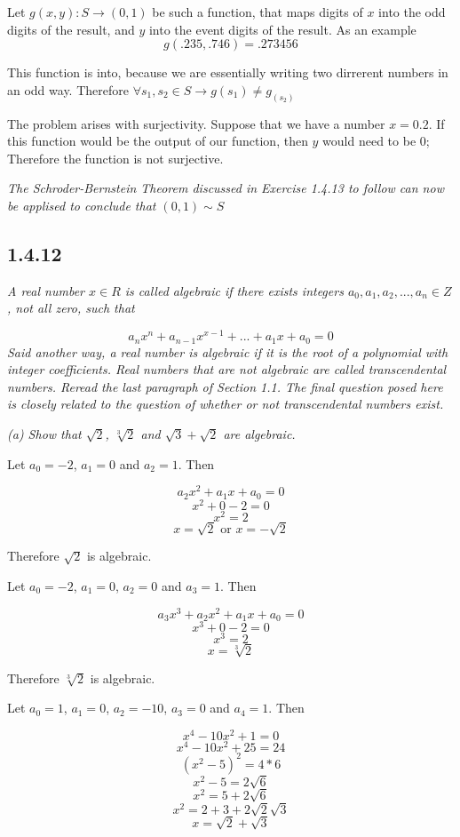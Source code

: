 \documentclass[11pt,oneside,titlepage]{book}
\begin{document}
Let $g(x, y): S \to (0, 1)$ be such a function, that maps digits of $x$ into the
odd digits of the result, and $y$ into the event digits of the result. As an example
$$g(.235, .746) = .273456$$

This function is into, because we are essentially writing two dirrerent numbers in an
odd way. 
Therefore $\forall s_1, s_2 \in S \to g(s_1) \neq g_(s_2) \ $

The problem arises with surjectivity. Suppose that we have a number $x = 0.2$. If
this function would be the output of our function, then $y$ would need to be 0;
Therefore the function is not surjective.

\textit{The Schroder-Bernstein Theorem discussed in Exercise 1.4.13 to follow
  can now be applised to conclude that $(0,1) \sim S$}

\subsection*{1.4.12}
\textit{A real number $x \in R$ is called algebraic if there exists integers
  $a_0, a_1, a_2, ..., a_n \in Z$, not all zero, such that }

$$a_n x^n + a_{n - 1} x^{x - 1} + ... + a_1 x + a_0 = 0$$
\textit{Said another way, a real number is algebraic if it is the root of a polynomial
  with integer coefficients. Real numbers that are not algebraic are called transcendental
  numbers. Reread the last paragraph of Section 1.1. The final question posed here is
  closely related to the question of whether or not transcendental numbers exist.}

\textit{(a) Show that $\sqrt{2}$, $\sqrt[3]{2}$ and $\sqrt{3} + \sqrt{2}$ are algebraic.}

Let $a_0 = -2$, $a_1 = 0$ and $a_2 = 1$. Then

$$a_2 x^2 + a_1 x + a_0 = 0$$
$$ x^2 + 0  - 2 = 0$$
$$x^2 = 2$$
$$x = \sqrt{2} \text{ or } x = -\sqrt{2}$$

Therefore $\sqrt{2}$ is algebraic.

Let $a_0 = -2$, $a_1 = 0$, $a_2 = 0$ and $a_3 = 1$. Then

$$a_3 x^3 + a_2 x^2 + a_1 x + a_0 = 0$$
$$ x^3 + 0  - 2 = 0$$
$$x^3 = 2$$
$$x = \sqrt[3]{2}$$

Therefore $\sqrt[3]{2}$ is algebraic.

Let $a_0 = 1$, $a_1 = 0$, $a_2 = -10$, $a_3 = 0$ and $a_4 = 1$. Then

$$x^4 - 10 x^2 + 1 = 0$$
$$x^4 - 10 x^2 + 25 =  24$$
$$(x^2 - 5)^2 =  4 * 6$$
$$x^2 - 5 =  2\sqrt{6}$$
$$x^2 = 5 + 2\sqrt{6}$$
$$x^2 = 2 + 3 + 2\sqrt{2}\sqrt{3}$$
$$x = \sqrt{2} + \sqrt{3}$$
\end{document}
